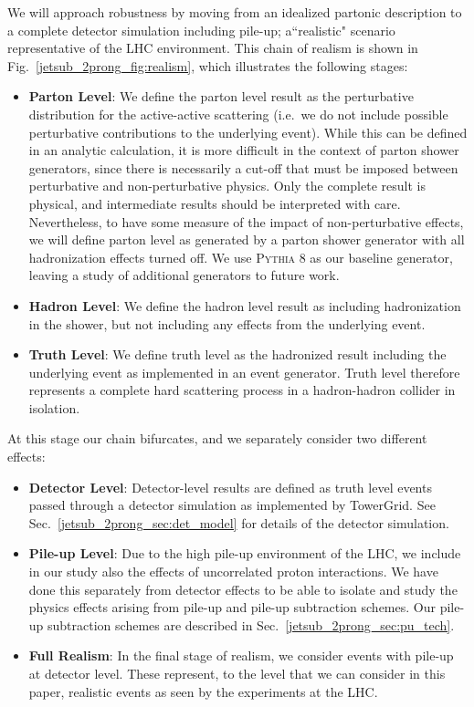 \documentclass[11pt]{cernrep}
\begin{document}
We will approach robustness by moving from an idealized partonic description to a complete detector simulation including pile-up; a``realistic" scenario representative of the LHC environment.
%
This chain of realism is shown in Fig.~\ref{jetsub_2prong_fig:realism}, which illustrates the following stages:
%
\begin{itemize}
\item {\bf Parton Level}: We define the parton level result as the
  perturbative distribution for the active-active scattering (i.e.\ we
  do not include possible perturbative contributions to the underlying
  event).
  While this can be defined in an analytic calculation, it is
  more difficult in the context of parton shower generators, since
  there is necessarily a cut-off that must be imposed between
  perturbative and non-perturbative physics.
  Only the complete result
  is physical, and intermediate results should be interpreted with
  care.
  Nevertheless, to have some measure of the impact of
  non-perturbative effects, we will define parton level as generated
  by a parton shower generator with all hadronization effects turned
  off.
  We use \textsc{Pythia 8} \cite{Sjostrand:2006za,Sjostrand:2007gs} as our baseline generator, leaving a study of additional generators to future work.
%
\item {\bf Hadron Level}: We define the hadron level result as including hadronization in the shower, but not including any effects from the underlying event.
%
\item {\bf Truth Level}:  We define truth level as the hadronized result including the underlying event as implemented in an event generator.
%
Truth level therefore represents a complete hard scattering process in a hadron-hadron collider in isolation.
%
\end{itemize}
At this stage our chain bifurcates, and we separately consider two different effects:
\begin{itemize}
\item {\bf Detector Level}: Detector-level results are defined as truth level events passed through a detector simulation as implemented by TowerGrid.  See Sec.~\ref{jetsub_2prong_sec:det_model} for details of the detector simulation.
%
\item {\bf Pile-up Level}: Due to the high pile-up environment of the LHC, we include in our study also the effects of uncorrelated proton interactions. We have done this separately from detector effects to be able to isolate and study the physics effects arising from pile-up and pile-up subtraction schemes. Our pile-up subtraction schemes are described in Sec.~\ref{jetsub_2prong_sec:pu_tech}.
%
\item {\bf Full Realism}: In the final stage of realism, we consider events with pile-up at detector
  level.
  These represent, to the level that we can consider in this
  paper, realistic events as seen by the experiments at the
  LHC.
\end{itemize}
\end{document}
